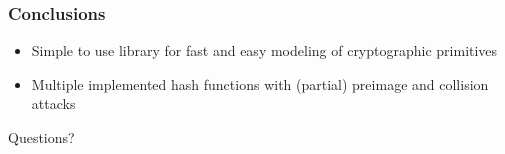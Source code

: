\documentclass{beamer}
\begin{document}
\begin{frame}
\frametitle{Conclusions}
\begin{itemize}
\item Simple to use library for fast and easy modeling of cryptographic primitives
\item Multiple implemented hash functions with (partial) preimage and collision attacks
\end{itemize}
\end{frame}

\begin{frame}
\begin{center}
Questions?
\end{center}
\end{frame}


%
%
\end{document}
